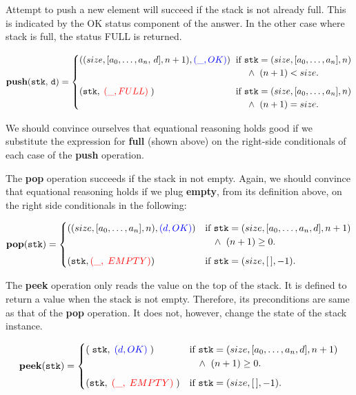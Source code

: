 \documentclass[10pt]{article}
\begin{document}
    Attempt to push a new element will succeed if the stack is not already full. This is indicated by the OK status component of the answer. In the other case where stack is full, the status FULL is returned.

    \[
        \mathtt{\mathbf{push}(stk,\, d)} = \begin{cases} ((size, [a_0, \dots, a_n, \, d], n+1),  {\textcolor{blue}{(\_, OK)}}) & \hspace*{-4pt}\mbox{if } \mathtt{stk} = (size, [a_0,\dots,a_n], n)\\ & \hspace*{10pt}\wedge\; \; (n+1) < size. \vspace*{6pt}\\ 
        (\mathtt{stk},\;{\textcolor{red}{(\_, FULL)}} \; ) & \hspace*{-4pt}\mbox{if } \mathtt{stk} = (size, [a_0,\dots,a_n], n)\\ %
        & \hspace*{10pt}\wedge\; \; (n+1) = size. \end{cases} 
    \]

    We should convince ourselves that equational reasoning holds good if we substitute the expression for \textbf{full} (shown above) on the right-side conditionals of each case of the \textbf{push} operation. 
  
    The \textbf{pop} operation succeeds if the stack in not empty. Again, we should convince that equational reasoning holds if we plug \textbf{empty}, from its definition above, on the right side conditionals in the following: 

    \[
        \mathtt{\mathbf{pop}(stk)} = \begin{cases} ((size, [a_0, \dots, a_n], n), {\textcolor{blue}{(d, OK)}}) & \mbox{if } \mathtt{stk} = (size, [a_0,\dots,a_n, d], n+1)\\ & \hspace*{10pt}\wedge\; \; (n+1) \geq 0 . \vspace*{6pt}\\ 
        (\mathtt{stk},{\textcolor{red}{(\_,\; EMPTY)}})  & \mbox{if }\mathtt{stk} = (size, [\,], -1). \end{cases} 
    \]

    The \textbf{peek} operation only reads the value on the top of the stack. It is defined to return a value when the stack is not empty. Therefore, its preconditions are same as that of the \textbf{pop} operation. It does not, however, change the state of the stack instance.

    \[
        \mathtt{\mathbf{peek}(stk)} = \begin{cases} (\; \mathtt{stk}, \; {\textcolor{blue}{(d, OK)}}\;) & \mbox{if } \mathtt{stk} = (size, [a_0,\dots,a_n, d], n+1)\\ & \hspace*{10pt}\wedge\; \; (n+1) \geq 0 . \vspace*{6pt}\\ 
        (\mathtt{stk},\; {\textcolor{red}{(\_,\; EMPTY)}}\;)  & \mbox{if }\mathtt{stk} = (size, [\,], -1). \end{cases} 
    \]
\end{document}
